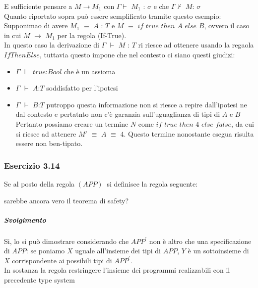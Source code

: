 E sufficiente pensare a $M \rightarrow M_1$ con $\Gamma\vdash$ $M_1$ : $\sigma$ e che 
$\Gamma\nvdash$ $M$: $\sigma$\\
Quanto riportato sopra pu\`o essere semplificato tramite questo esempio:\\
Supponimao di avere $M_1$ $\equiv$ $A$ : $T$ e $M$ $\equiv$ $if$ $true$ $then$ $A$ $else$ $B$, ovvero il caso in cui $M$ $\rightarrow$ $M_1$ per la regola (If-True).\\
In questo caso la derivazione di $\Gamma$ $\vdash$ $M$ : $T$ ri riesce ad ottenere usando la regaola $IfThenElse$, tuttavia questo impone che nel contesto ci siano questi giudizi:
\begin{itemize}
\item $\Gamma$ $\vdash$ $true$:$Bool$ che \`e un assioma
\item $\Gamma$ $\vdash$ $A$:$T$ soddisfatto per l'ipotesi 
\item  $\Gamma$ $\vdash$ $B$:$T$ putroppo questa informazione non si riesce a repire dall'ipotesi ne dal contesto e pertatnto non c'\`e garanzia sull'uguaglianza di tipi di $A$ e $B$\\
Pertanto possiamo creare un termine $N$ come $if$ $true$ $then$ $4$ $else$ $false$, da cui si riesce ad attenere $M'$ $\equiv$ $A$ $\equiv$ $4$. Questo termine nonostante esegua risulta essere non ben-tipato.


\end{itemize}







\subsubsection*{Esercizio 3.14}
Se al posto della regola $(APP)\:$ si definisce la regola seguente:

\begin{prooftree} 
	
\end{prooftree} 

sarebbe ancora vero il teorema di safety?
\subparagraph*{Svolgimento}
Si, lo si pu\`o dimostrare considerando che $APP^{\prime}$ non \`e altro che una specificazione di $APP$: se poniamo $X$ uguale all'insieme dei tipi di $APP$, $Y$ \`e un sottoinsieme di $X$ corrispondente ai possibili tipi di $APP^{\prime}$.\\
In sostanza la regola restringere l'insieme dei programmi realizzabili con il precedente type system

